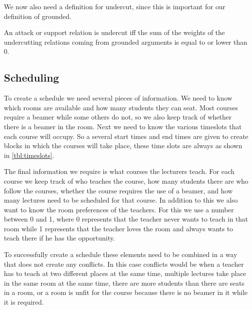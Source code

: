We now also need a definition for undercut, since this is important for our
definition of grounded.
\begin{defn}
    An attack or support relation is undercut iff the sum of the weights of the
    undercutting relations coming from grounded arguments is equal to or
    lower than 0.
\end{defn}


\subsection{Scheduling}
To create a schedule we need several pieces of information. We need to know
which rooms are available and how many students they can seat. Most courses
require a beamer while some others do not, so we also keep track of whether
there is a beamer in the room. Next we need to know the various timeslots that
each course will occupy. So a several start times and end times are given to
create blocks in which the courses will take place, these time slots are always
as shown in \autoref{tbl:timeslots}.

The final information we require is what courses the lecturers teach. For each
course we keep track of who teaches the course, how many students there are who
follow the courses, whether the course requires the use of a beamer, and how
many lectures need to be scheduled for that course. In addition to this we also
want to know the room preferences of the teachers. For this we use a number
between 0 and 1, where 0 represents that the teacher never wants to teach in
that room while 1 represents that the teacher loves the room and always wants to
teach there if he has the opportunity.

To successfully create a schedule these elements need to be combined in a way
that does not create any conflicts. In this case conflicts would be when a
teacher has to teach at two different places at the same time, multiple lectures
take place in the same room at the same time, there are more students than there
are seats in a room, or a room is unfit for the course because there is no
beamer in it while it is required.

